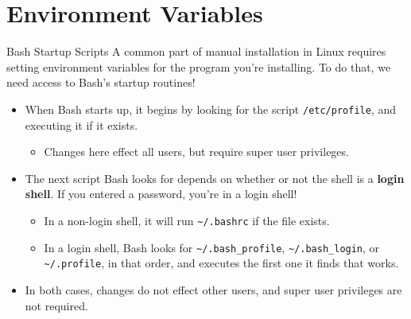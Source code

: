 \documentclass[11pt]{beamer}
\begin{document}

\section[Environment]{Environment Variables}
\begin{frame}{Bash Startup Scripts}
A common part of manual installation in Linux requires setting environment variables for the program you're installing. To do that, we need access to Bash's startup routines! 
\begin{itemize} 
\item When Bash starts up, it begins by looking for the script \texttt{/etc/profile}, and executing it if it exists.
\begin{itemize}
\item Changes here effect all users, but require super user privileges.
\end{itemize}
\item The next script Bash looks for depends on whether or not the shell is a \textbf{login shell}.  If you entered a password, you're in a login shell!
\begin{itemize}
\item In a non-login shell, it will run \texttt{\textasciitilde/.bashrc} if the file exists.
\item In a login shell, Bash looks for \texttt{\textasciitilde/.bash\_profile}, \texttt{\textasciitilde/.bash\_login}, or \texttt{\textasciitilde/.profile}, in that order, and executes the first one it finds that works.
\end{itemize}
\item In both cases, changes do not effect other users, and super user privileges are not required.
\end{itemize}

\end{frame}
\end{document}
